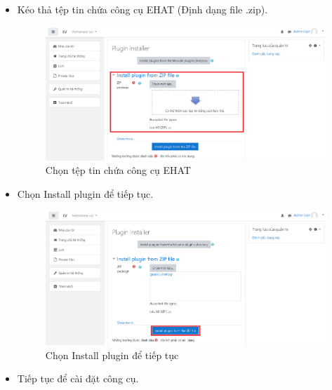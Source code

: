 \begin{itemize}
	\newpage
	\item Kéo thả tệp tin chứa công cụ EHAT (Định dạng file .zip).
	
	\begin{center}
		\begin{figure}[htp]
			\begin{center}
				\includegraphics[width=1\linewidth]{img/8}
			\end{center}
			\caption{Chọn tệp tin chứa công cụ EHAT}
			\label{refhinh38}
		\end{figure}
	\end{center}
	
	\item Chọn Install plugin để tiếp tục.
	
	\begin{center}
		\begin{figure}[htp]
			\begin{center}
				\includegraphics[width=1\linewidth]{img/9}
			\end{center}
			\caption{Chọn Install plugin để tiếp tục}
			\label{refhinh39}
		\end{figure}
	\end{center}
	
	\newpage
	\item Tiếp tục để cài đặt công cụ.
	

\end{itemize}
